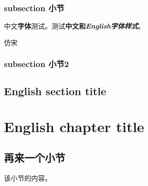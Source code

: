 \documentclass[a4paper,twoside]{ctexbook}
\begin{document}
\lipsum[3-5]

\subsection{subsection 小节}

中文\textbf{字体}测试。测试\textbf{中文和\textit{English字体样式}}。

{\fzfs 仿宋}

\subsection{subsection 小节2}


\section{English section title}

\lipsum[2-5]

\chapter{English chapter title}

\hspace{.15\linewidth}\begin{minipage}[H]{.7\linewidth}
{
  \hypersetup{hidelinks}
  \startcontents[chapters]
}
\end{minipage}
\vspace{10ex}

\lipsum[3]

\clearpage

\section{再来一个小节}

该小节的内容。
\end{document}
